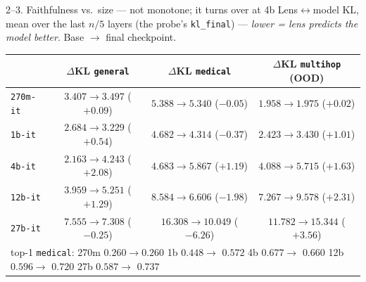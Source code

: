 \documentclass[aspectratio=169,10pt]{beamer}
\newcommand{\good}[1]{\textcolor{up}{#1}}
\newcommand{\bad}[1]{\textcolor{down}{#1}}
\begin{document}
\begin{frame}{2--3. Faithfulness vs.\ size --- \bad{not monotone; it turns over at 4b}}
  \small
  Lens$\leftrightarrow$model KL, mean over the last $n/5$ layers
  (the probe's \texttt{kl\_final}) --- \emph{lower = lens predicts the model
  better}. Base $\rightarrow$ final checkpoint.

  \vspace{0.5em}
  \centering
  \begin{tabular}{lccc}
    \toprule
    & $\Delta$KL \texttt{general} & $\Delta$KL \texttt{medical} & $\Delta$KL \texttt{multihop} (OOD) \\
    \midrule
    \texttt{270m-it} & $3.407 \rightarrow 3.497$ \; (\bad{$+0.09$})
                     & $5.388 \rightarrow 5.340$ \; (\good{$-0.05$})
                     & $1.958 \rightarrow 1.975$ \; (\bad{$+0.02$}) \\
    \texttt{1b-it}   & $2.684 \rightarrow 3.229$ \; (\bad{$+0.54$})
                     & $4.682 \rightarrow 4.314$ \; (\good{$-0.37$})
                     & $2.423 \rightarrow 3.430$ \; (\bad{$+1.01$}) \\
    \texttt{4b-it}   & $2.163 \rightarrow 4.243$ \; (\bad{$\mathbf{+2.08}$})
                     & $4.683 \rightarrow 5.867$ \; (\bad{$\mathbf{+1.19}$})
                     & $4.088 \rightarrow 5.715$ \; (\bad{$+1.63$}) \\
    \texttt{12b-it}  & $3.959 \rightarrow 5.251$ \; (\bad{$+1.29$})
                     & $8.584 \rightarrow 6.606$ \; (\good{$-1.98$})
                     & $7.267 \rightarrow 9.578$ \; (\bad{$+2.31$}) \\
    \texttt{27b-it}  & $7.555 \rightarrow 7.308$ \; (\good{$\mathbf{-0.25}$})
                     & $16.308 \rightarrow 10.049$ \; (\good{$\mathbf{-6.26}$})
                     & $11.782 \rightarrow 15.344$ \; (\bad{$\mathbf{+3.56}$}) \\
    \midrule
    \multicolumn{4}{l}{\scriptsize top-1 \texttt{medical}: \;
      270m $0.260 \rightarrow 0.260$ \quad
      1b $0.448 \rightarrow$ \good{$0.572$} \quad
      4b $0.677 \rightarrow$ \bad{$0.660$} \quad
      12b $0.596 \rightarrow$ \good{$0.720$} \quad
      27b $0.587 \rightarrow$ \good{$\mathbf{0.737}$}} \\
    \bottomrule
  \end{tabular}


\end{frame}
\end{document}
